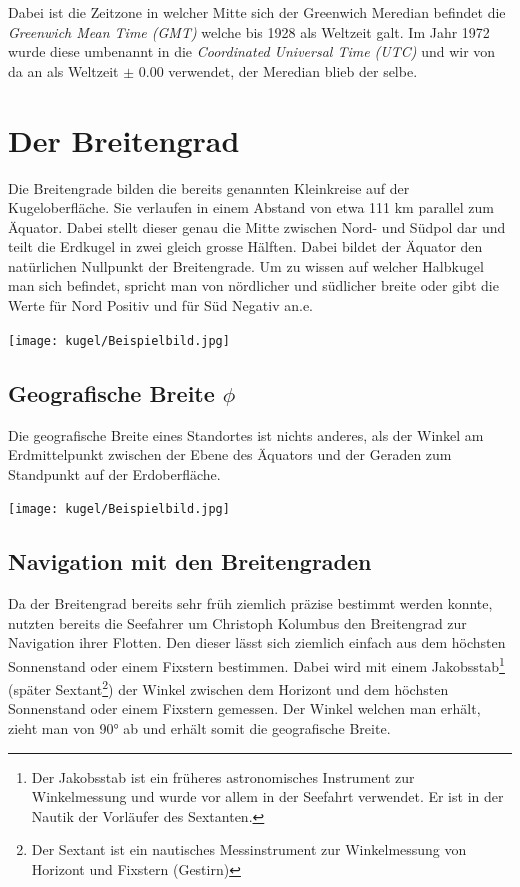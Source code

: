 \begin{refsection}
\begin{refsection}
Dabei ist die Zeitzone in welcher Mitte sich der Greenwich Meredian befindet die \textit{Greenwich Mean Time (GMT)} welche bis 1928 als Weltzeit galt. Im Jahr 1972 wurde diese umbenannt in die \textit{Coordinated Universal Time (UTC)} und wir von da an als Weltzeit $\pm$ 0.00 verwendet, der Meredian blieb der selbe.


\section{Der Breitengrad}
Die Breitengrade bilden die bereits genannten Kleinkreise auf der Kugeloberfläche. Sie verlaufen in einem Abstand von etwa 111 km parallel zum Äquator. Dabei stellt dieser genau die Mitte zwischen Nord- und Südpol dar und teilt die Erdkugel in zwei gleich grosse Hälften. Dabei bildet der Äquator den natürlichen Nullpunkt der Breitengrade. Um zu wissen auf welcher Halbkugel man sich befindet, spricht man von nördlicher und südlicher breite oder gibt die Werte für Nord Positiv und für Süd Negativ an.e.

\begin{center}
        \texttt{[image: kugel/Beispielbild.jpg]}
\end{center}


\subsection{Geografische Breite $\phi$}
\begin{definition}
Die geografische Breite eines Standortes ist nichts anderes, als der Winkel am Erdmittelpunkt zwischen der Ebene des Äquators und der Geraden zum Standpunkt auf der Erdoberfläche.
\end{definition}

\begin{center}
        \texttt{[image: kugel/Beispielbild.jpg]}
\end{center}


\subsection{Navigation mit den Breitengraden}
Da der Breitengrad bereits sehr früh ziemlich präzise bestimmt werden konnte, nutzten bereits die Seefahrer um Christoph Kolumbus den Breitengrad zur Navigation ihrer Flotten.
Den dieser lässt sich ziemlich einfach aus dem höchsten Sonnenstand oder einem Fixstern bestimmen. Dabei wird mit einem Jakobsstab\footnote{%
Der Jakobsstab ist ein früheres astronomisches Instrument zur Winkelmessung und wurde vor allem in der Seefahrt verwendet. Er ist in der Nautik der Vorläufer des Sextanten.} (später Sextant\footnote{%
Der Sextant ist ein nautisches Messinstrument zur Winkelmessung von Horizont und Fixstern (Gestirn)}) der Winkel zwischen dem Horizont und dem höchsten Sonnenstand oder einem Fixstern gemessen. Der Winkel welchen man erhält, zieht man von 90° ab und erhält somit die geografische Breite. \\


\end{refsection}
\end{refsection}
